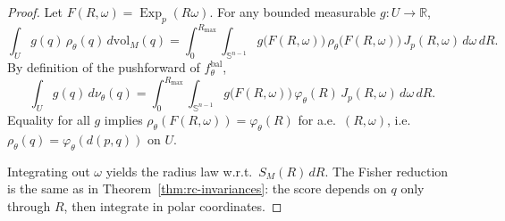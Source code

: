 \documentclass[10pt,a4paper]{amsart}
\newcommand{\Exp}{\operatorname{Exp}}
\newcommand{\RR}{\mathbb{R}}
\newcommand{\SSS}{\mathbb{S}}
\begin{document}
\begin{proof}
Let $F(R,\omega)=\Exp_p(R\omega)$.
For any bounded measurable $g:U\to\RR$,
\[
\int_U g(q)\,\rho_\theta(q)\,d\mathrm{vol}_M(q)
=
\int_0^{R_{\max}}\!\!\int_{\SSS^{n-1}}
g\!\bigl(F(R,\omega)\bigr)\,\rho_\theta\!\bigl(F(R,\omega)\bigr)\,J_p(R,\omega)\,d\omega\,dR.
\]
By definition of the pushforward of $f^{\mathrm{bal}}_\theta$,
\[
\int_U g(q)\,d\nu_\theta(q)
=
\int_0^{R_{\max}}\!\!\int_{\SSS^{n-1}}
g\!\bigl(F(R,\omega)\bigr)\,\varphi_\theta(R)\,J_p(R,\omega)\,d\omega\,dR.
\]
Equality for all $g$ implies $\rho_\theta(F(R,\omega))=\varphi_\theta(R)$ for a.e.\ $(R,\omega)$,
i.e.\ $\rho_\theta(q)=\varphi_\theta(d(p,q))$ on $U$.

Integrating out $\omega$ yields the radius law w.r.t.\ $S_M(R)\,dR$.
The Fisher reduction is the same as in Theorem~\ref{thm:rc-invariances}:
the score depends on $q$ only through $R$, then integrate in polar coordinates.
\end{proof}
\end{document}
